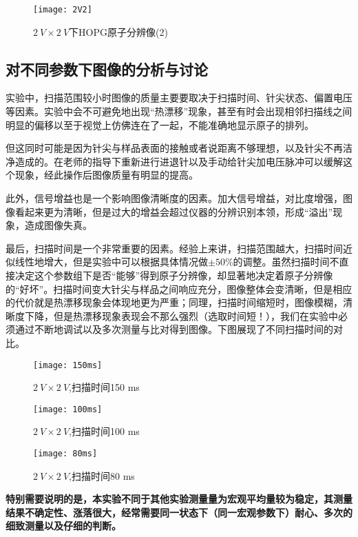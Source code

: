 \documentclass[aps,pre,12pt,preprint,onecolumn,showpacs,showkeys]{revtex4-1}
\begin{document}
\begin{figure}[H]
\centering
\texttt{[image: 2V2]}
\centering
\caption{\label{fig:图7}%
$2\ V\times2\ V$下HOPG原子分辨像(2)}
\end{figure}

\subsection{对不同参数下图像的分析与讨论}
实验中，扫描范围较小时图像的质量主要要取决于扫描时间、针尖状态、偏置电压等因素。实验中会不可避免地出现“热漂移”现象，甚至有时会出现相邻扫描线之间明显的偏移以至于视觉上仿佛连在了一起，不能准确地显示原子的排列。\par
但这同时可能是因为针尖与样品表面的接触或者说距离不够理想，以及针尖不再洁净造成的。在老师的指导下重新进行进退针以及手动给针尖加电压脉冲可以缓解这个现象，经此操作后图像质量有明显的提高。\par
此外，信号增益也是一个影响图像清晰度的因素。加大信号增益，对比度增强，图像看起来更为清晰，但是过大的增益会超过仪器的分辨识别本领，形成“溢出”现象，造成图像失真。\par
最后，扫描时间是一个非常重要的因素。经验上来讲，扫描范围越大，扫描时间近似线性地增大，但是实验中可以根据具体情况做$\pm 50\%$的调整。虽然扫描时间不直接决定这个参数组下是否“能够”得到原子分辨像，却显著地决定着原子分辨像的“好坏”。扫描时间变大针尖与样品之间响应充分，图像整体会变清晰，但是相应的代价就是热漂移现象会体现地更为严重；同理，扫描时间缩短时，图像模糊，清晰度下降，但是热漂移现象表现会不那么强烈（选取时间短！），我们在实验中必须通过不断地调试以及多次测量与比对得到图像。下图展现了不同扫描时间的对比。\par

\begin{figure}[H]
\centering
\texttt{[image: 150ms]}
\centering
\caption{\label{fig:图8}%
$2\ V\times2\ V$,扫描时间150 ms}
\end{figure}

\begin{figure}[H]
\centering
\texttt{[image: 100ms]}
\centering
\caption{\label{fig:图8}%
$2\ V\times2\ V$,扫描时间100 ms}
\end{figure}

\begin{figure}[H]
\centering
\texttt{[image: 80ms]}
\centering
\caption{\label{fig:图8}%
$2\ V\times2\ V$,扫描时间80 ms}
\end{figure}

\par
\textbf{特别需要说明的是，本实验不同于其他实验测量量为宏观平均量较为稳定，其测量结果不确定性、涨落很大，经常需要同一状态下（同一宏观参数下）耐心、多次的细致测量以及仔细的判断。}
\end{document}
